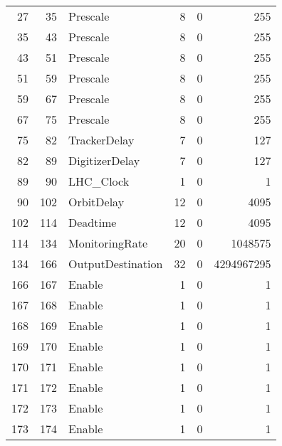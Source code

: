 \begin{table}[htbp]
{\begin{tabular}{rrlrrr}
    27    & 35    & Prescale & 8     & 0     & 255 \\
    35    & 43    & Prescale & 8     & 0     & 255 \\
    43    & 51    & Prescale & 8     & 0     & 255 \\
    51    & 59    & Prescale & 8     & 0     & 255 \\
    59    & 67    & Prescale & 8     & 0     & 255 \\
    67    & 75    & Prescale & 8     & 0     & 255 \\
    75    & 82    & TrackerDelay & 7     & 0     & 127 \\
    82    & 89    & DigitizerDelay & 7     & 0     & 127 \\
    89    & 90    & LHC\_Clock & 1     & 0     & 1 \\
    90    & 102   & OrbitDelay & 12    & 0     & 4095 \\
    102   & 114   & Deadtime & 12    & 0     & 4095 \\
    114   & 134   & MonitoringRate & 20    & 0     & 1048575 \\
    134   & 166   & OutputDestination & 32    & 0     & 4294967295 \\
    166   & 167   & Enable & 1     & 0     & 1 \\
    167   & 168   & Enable & 1     & 0     & 1 \\
    168   & 169   & Enable & 1     & 0     & 1 \\
    169   & 170   & Enable & 1     & 0     & 1 \\
    170   & 171   & Enable & 1     & 0     & 1 \\
    171   & 172   & Enable & 1     & 0     & 1 \\
    172   & 173   & Enable & 1     & 0     & 1 \\
    173   & 174   & Enable & 1     & 0     & 1 \\
    \end{tabular}%
    }
  \label{tab:VariableLayoutTLBConfigurationFULL}%
\end{table}%